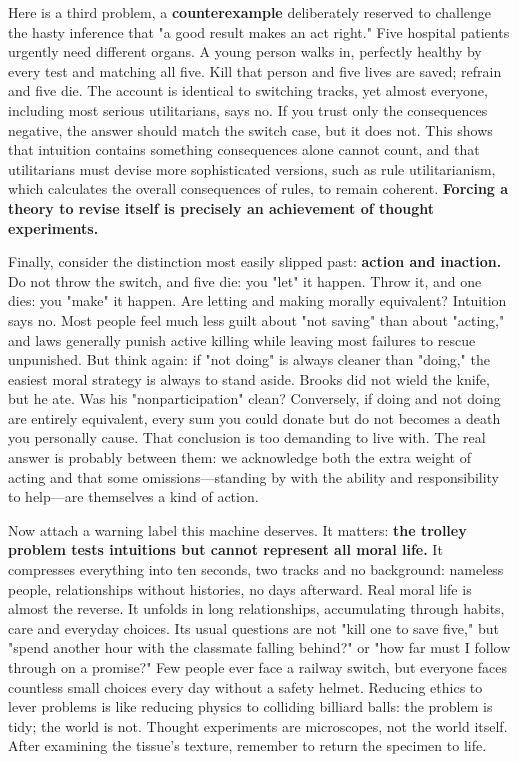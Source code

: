 Here is a third problem, a \textbf{counterexample} deliberately reserved to challenge the hasty inference that "a good result makes an act right." Five hospital patients urgently need different organs. A young person walks in, perfectly healthy by every test and matching all five. Kill that person and five lives are saved; refrain and five die. The account is identical to switching tracks, yet almost everyone, including most serious utilitarians, says no. If you trust only the consequences negative, the answer should match the switch case, but it does not. This shows that intuition contains something consequences alone cannot count, and that utilitarians must devise more sophisticated versions, such as rule utilitarianism, which calculates the overall consequences of rules, to remain coherent. \textbf{Forcing a theory to revise itself is precisely an achievement of thought experiments.}

Finally, consider the distinction most easily slipped past: \textbf{action and inaction.} Do not throw the switch, and five die: you "let" it happen. Throw it, and one dies: you "make" it happen. Are letting and making morally equivalent? Intuition says no. Most people feel much less guilt about "not saving" than about "acting," and laws generally punish active killing while leaving most failures to rescue unpunished. But think again: if "not doing" is always cleaner than "doing," the easiest moral strategy is always to stand aside. Brooks did not wield the knife, but he ate. Was his "nonparticipation" clean? Conversely, if doing and not doing are entirely equivalent, every sum you could donate but do not becomes a death you personally cause. That conclusion is too demanding to live with. The real answer is probably between them: we acknowledge both the extra weight of acting and that some omissions---standing by with the ability and responsibility to help---are themselves a kind of action.

Now attach a warning label this machine deserves. It matters: \textbf{the trolley problem tests intuitions but cannot represent all moral life.} It compresses everything into ten seconds, two tracks and no background: nameless people, relationships without histories, no days afterward. Real moral life is almost the reverse. It unfolds in long relationships, accumulating through habits, care and everyday choices. Its usual questions are not "kill one to save five," but "spend another hour with the classmate falling behind?" or "how far must I follow through on a promise?" Few people ever face a railway switch, but everyone faces countless small choices every day without a safety helmet. Reducing ethics to lever problems is like reducing physics to colliding billiard balls: the problem is tidy; the world is not. Thought experiments are microscopes, not the world itself. After examining the tissue's texture, remember to return the specimen to life.


